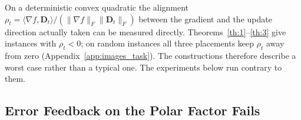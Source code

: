 On a deterministic convex quadratic the alignment $\rho_t=\langle\nabla f,\mathbf{D}_t\rangle/(\|\nabla f\|_F\|\mathbf{D}_t\|_F)$ between the gradient and the update direction actually taken can be measured directly. Theorems~\ref{th:1}--\ref{th:3} give instances with $\rho_t<0$; on random instances all three placements keep $\rho_t$ away from zero (Appendix~\ref{app:images_task}). The constructions therefore describe a worst case rather than a typical one. The experiments below run contrary to them.

\subsection{Error Feedback on the Polar Factor Fails}

